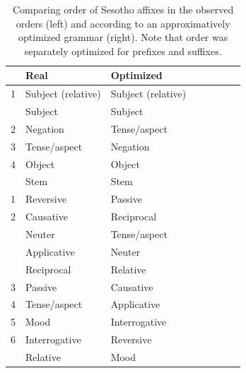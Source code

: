 \begin{table} %
    \centering
    \begin{tabular}{llllllll}
	    &	    Real & Optimized \\ \hline\hline
	    1 & Subject (relative) & Subject (relative) \\
 & Subject & Subject \\
2 & Negation & Tense/aspect \\
3 & Tense/aspect & Negation \\
4 & Object & Object \\
            \hline
            &Stem & Stem \\ \hline
	    1 & Reversive & Passive \\
2 & Causative & Reciprocal \\
 & Neuter & Tense/aspect \\
 & Applicative & Neuter \\
 & Reciprocal & Relative \\
3 & Passive & Causative \\
4 & Tense/aspect & Applicative \\
5 & Mood & Interrogative \\
6 & Interrogative & Reversive \\
 & Relative & Mood \\\hline
    \end{tabular}
	\caption{Comparing order of Sesotho affixes in the observed orders (left) and according to an approximatively optimized grammar (right). Note that order was separately optimized for prefixes and suffixes.}
    \label{tab:grammar-table-sesotho}
\end{table}

